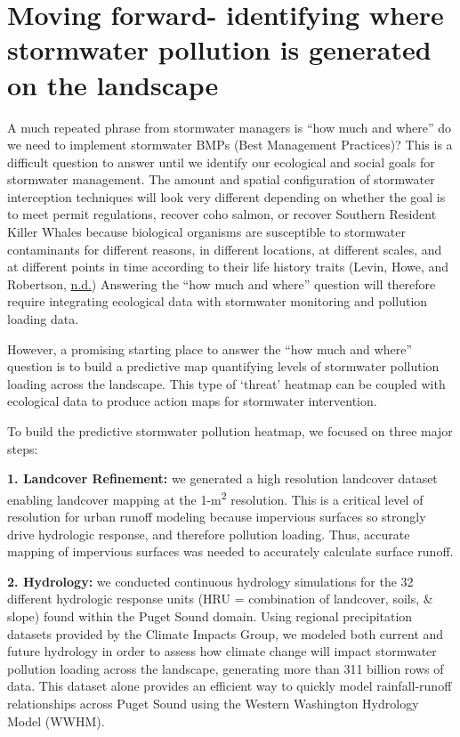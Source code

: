 \documentclass[
]{report}
\begin{document}
\hypertarget{moving-forward--identifying-where-stormwater-pollution-is-generated-on-the-landscape}{%
\section{Moving forward- identifying where stormwater pollution is generated on the landscape}\label{moving-forward--identifying-where-stormwater-pollution-is-generated-on-the-landscape}}

A much repeated phrase from stormwater managers is ``how much and where'' do we need to implement stormwater BMPs (Best Management Practices)? This is a difficult question to answer until we identify our ecological and social goals for stormwater management. The amount and spatial configuration of stormwater interception techniques will look very different depending on whether the goal is to meet permit regulations, recover coho salmon, or recover Southern Resident Killer Whales because biological organisms are susceptible to stormwater contaminants for different reasons, in different locations, at different scales, and at different points in time according to their life history traits (Levin, Howe, and Robertson, \protect\hyperlink{ref-Levin}{n.d.}) Answering the ``how much and where'' question will therefore require integrating ecological data with stormwater monitoring and pollution loading data.

However, a promising starting place to answer the ``how much and where'' question is to build a predictive map quantifying levels of stormwater pollution loading across the landscape. This type of `threat' heatmap can be coupled with ecological data to produce action maps for stormwater intervention.

To build the predictive stormwater pollution heatmap, we focused on three major steps:

\textbf{1. Landcover Refinement:} we generated a high resolution landcover dataset enabling landcover mapping at the 1-m\textsuperscript{2} resolution. This is a critical level of resolution for urban runoff modeling because impervious surfaces so strongly drive hydrologic response, and therefore pollution loading. Thus, accurate mapping of impervious surfaces was needed to accurately calculate surface runoff.

\textbf{2. Hydrology:} we conducted continuous hydrology simulations for the 32 different hydrologic response units (HRU = combination of landcover, soils, \& slope) found within the Puget Sound domain. Using regional precipitation datasets provided by the Climate Impacts Group, we modeled both current and future hydrology in order to assess how climate change will impact stormwater pollution loading across the landscape, generating more than 311 billion rows of data. This dataset alone provides an efficient way to quickly model rainfall-runoff relationships across Puget Sound using the Western Washington Hydrology Model (WWHM).
\end{document}

